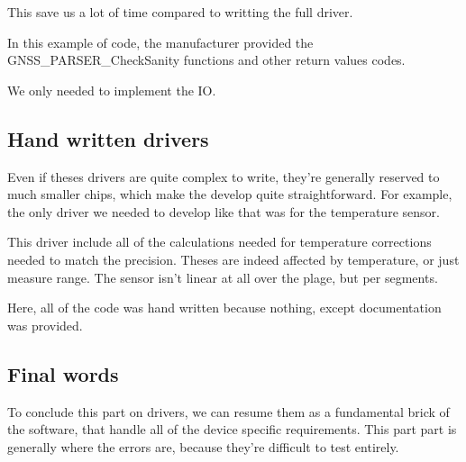This save us a lot of time compared to writting the full driver.

In this example of code, the manufacturer provided the GNSS\_PARSER\_CheckSanity functions
and other return values codes.

We only needed to implement the IO.

\subsection{Hand written drivers}
Even if theses drivers are quite complex to write, they're generally reserved to much
smaller chips, which make the develop quite straightforward.
For example, the only driver we needed to develop like that was for the temperature
sensor.

This driver include all of the calculations needed for temperature corrections
needed to match the precision. Theses are indeed affected by temperature,
or just measure range. The sensor isn't linear at all over the plage, but per
segments.

Here, all of the code was hand written because nothing, except documentation was provided.

\subsection{Final words}
To conclude this part on drivers, we can resume them as a fundamental brick of the software,
that handle all of the device specific requirements.
This part part is generally where the errors are, because they're difficult to test entirely.